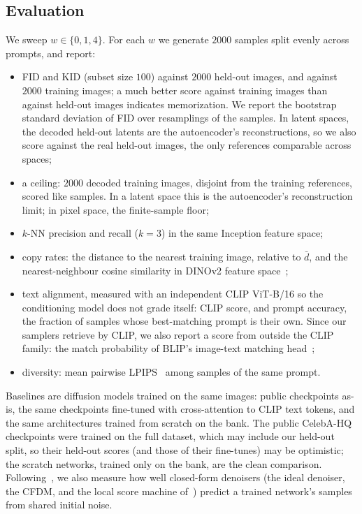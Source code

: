 \subsection{Evaluation}
\label{sec:eval}

We sweep $w\in\{0,1,4\}$. For each $w$ we generate $2000$ samples split evenly across prompts, and report:
\begin{itemize}
  \item FID and KID (subset size $100$) against $2000$ held-out images, and against $2000$ training images; a much better score against training images than against held-out images indicates memorization. We report the bootstrap standard deviation of FID over resamplings of the samples. In latent spaces, the decoded held-out latents are the autoencoder's reconstructions, so we also score against the real held-out images, the only references comparable across spaces;
  \item a ceiling: $2000$ decoded training images, disjoint from the training references, scored like samples. In a latent space this is the autoencoder's reconstruction limit; in pixel space, the finite-sample floor;
  \item $k$-NN precision and recall ($k=3$) in the same Inception feature space;
  \item copy rates: the distance to the nearest training image, relative to $\bar d$, and the nearest-neighbour cosine similarity in DINOv2 feature space~\cite{oquab2023dinov2};
  \item text alignment, measured with an independent CLIP ViT-B/16 so the conditioning model does not grade itself: CLIP score, and prompt accuracy, the fraction of samples whose best-matching prompt is their own. Since our samplers retrieve by CLIP, we also report a score from outside the CLIP family: the match probability of BLIP's image-text matching head~\cite{li2022blip};
  \item diversity: mean pairwise LPIPS~\cite{zhang2018lpips} among samples of the same prompt.
\end{itemize}
Baselines are diffusion models trained on the same images: public checkpoints as-is, the same checkpoints fine-tuned with cross-attention to CLIP text tokens, and the same architectures trained from scratch on the bank. The public CelebA-HQ checkpoints were trained on the full dataset, which may include our held-out split, so their held-out scores (and those of their fine-tunes) may be optimistic; the scratch networks, trained only on the bank, are the clean comparison. Following~\cite{lukoianov2025locality}, we also measure how well closed-form denoisers (the ideal denoiser, the CFDM, and the local score machine of~\cite{kamb2024analytic}) predict a trained network's samples from shared initial noise.
